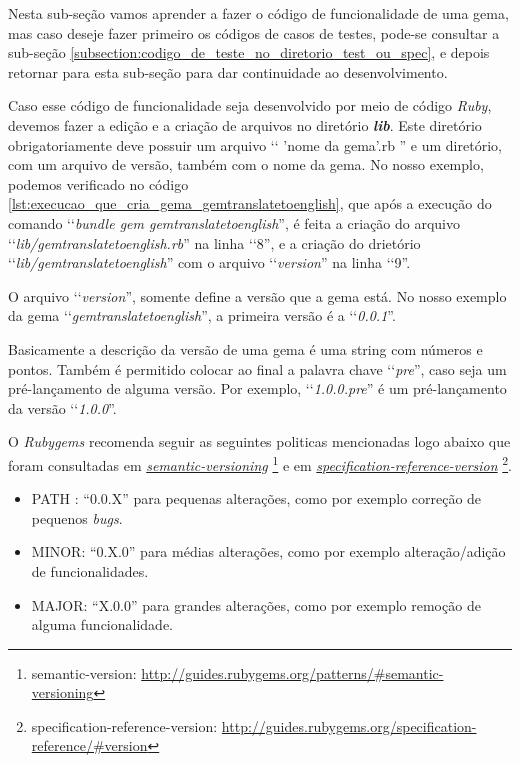 Nesta sub-seção vamos aprender a fazer o código de funcionalidade de uma gema, mas caso deseje fazer
primeiro os códigos de casos de testes, pode-se consultar a sub-seção
\ref{subsection:codigo_de_teste_no_diretorio_test_ou_spec}, e depois retornar para esta sub-seção para dar
continuidade ao desenvolvimento.

Caso esse código de funcionalidade seja desenvolvido por meio de código \emph{Ruby}, devemos fazer a
edição e a criação de arquivos no diretório \emph{\textbf{lib}}. Este diretório obrigatoriamente deve
possuir um arquivo ‘‘ 'nome da gema'.rb '' e um diretório, com um arquivo de versão, também com o
nome da gema. No nosso exemplo, podemos verificado no código
\ref{lst:execucao_que_cria_gema_gemtranslatetoenglish}, que após a execução do comando
‘‘\emph{bundle gem gemtranslatetoenglish}'', é feita a criação do arquivo
‘‘\emph{lib/gemtranslatetoenglish.rb}'' na linha ‘‘8'', e a criação do drietório
‘‘\emph{lib/gemtranslatetoenglish}'' com o arquivo ‘‘\emph{version}'' na linha ‘‘9''.

O arquivo ‘‘\emph{version}'', somente define a versão que a gema está. No nosso exemplo da gema
‘‘\emph{gemtranslatetoenglish}'', a primeira versão é a ‘‘\emph{0.0.1}''.

Basicamente a descrição da versão de uma gema é uma string com números e pontos. Também é permitido
colocar ao final a palavra chave ‘‘\emph{pre}'', caso seja um pré-lançamento de alguma versão.
Por exemplo, ‘‘\emph{1.0.0.pre}'' é um pré-lançamento da versão ‘‘\emph{1.0.0}''.

O \emph{Rubygems} recomenda seguir as seguintes politicas mencionadas logo abaixo que foram consultadas
em \emph{\href{http://guides.rubygems.org/patterns/\#semantic-versioning}{semantic-versioning}}
\footnote{semantic-version: \url{http://guides.rubygems.org/patterns/\#semantic-versioning}} e em
\emph{\href{http://guides.rubygems.org/specification-reference/\#version}{specification-reference-version}}
\footnote{specification-reference-version: \url{http://guides.rubygems.org/specification-reference/\#version}}.

\begin{itemize}
 \item PATH : “0.0.X” para pequenas alterações, como por exemplo correção de pequenos \emph{bugs}.
 \item MINOR: “0.X.0” para médias alterações, como por exemplo alteração/adição de funcionalidades.
 \item MAJOR: “X.0.0” para grandes alterações, como por exemplo remoção de alguma funcionalidade.
\end{itemize}

